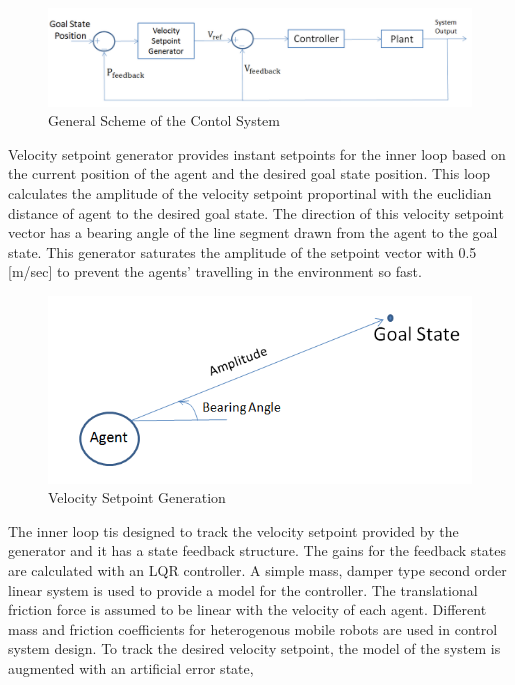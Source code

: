 \documentclass[twoside]{article}
\begin{document}
			\begin{figure}[H]
				\caption{General Scheme of the Contol System}
				\centering
				\includegraphics[scale = 0.45]{controller}
			\end{figure}


Velocity setpoint generator provides instant setpoints for the inner loop based on the current position of the agent and the desired goal state position.  This loop calculates the amplitude of the velocity setpoint proportinal with the euclidian distance of agent to the desired goal state. The direction of this velocity setpoint vector has a bearing angle of the line segment drawn from the agent to the goal state. This generator saturates the amplitude of the setpoint vector with 0.5 [m/sec] to prevent the agents' travelling in the environment so fast. 
	\begin{figure}[H]
		\caption{Velocity Setpoint Generation}
		\centering
		\includegraphics[scale = 0.50]{bearing}
	\end{figure}



The inner loop tis designed to track the velocity setpoint provided by the generator and it has a state feedback structure. The gains for the feedback states are calculated with an LQR controller. A simple mass, damper type second order linear system is used to provide a model for the controller. The translational friction force is assumed to be linear with the velocity of each agent. Different mass and friction coefficients for heterogenous mobile robots are used in control system design. To track the desired velocity setpoint, the model of the system is augmented with an artificial error state,
\end{document}
